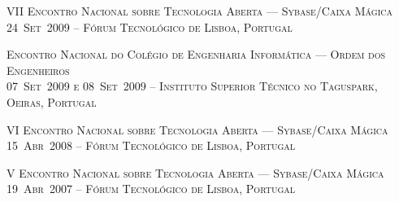 \documentclass[a4paper,fontsize=10pt]{scrartcl} %
\begin{document}
\begin{minipage}[t]{0.46\textwidth}
\par
\textsc{VII Encontro Nacional sobre Tecnologia Aberta --- Sybase/Caixa Mágica}\\
\small\textsc{24~Set~2009 -- Fórum Tecnológico de Lisboa, Portugal}\\ \normalsize
\par
\textsc{Encontro Nacional do Colégio de Engenharia Informática --- Ordem dos Engenheiros}\\
\small\textsc{07~Set~2009 e 08~Set~2009 -- Instituto Superior Técnico no Taguspark, Oeiras, Portugal}\\ \normalsize
\par
\textsc{VI Encontro Nacional sobre Tecnologia Aberta --- Sybase/Caixa Mágica}\\
\small\textsc{15~Abr~2008 -- Fórum Tecnológico de Lisboa, Portugal}\\ \normalsize
\par
\textsc{V Encontro Nacional sobre Tecnologia Aberta --- Sybase/Caixa Mágica}\\
\small\textsc{19~Abr~2007 -- Fórum Tecnológico de Lisboa, Portugal}\\ \normalsize
\par
\end{minipage} %
\end{document}
